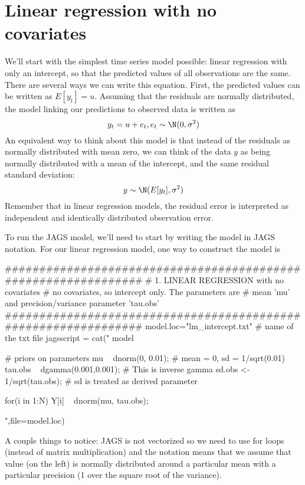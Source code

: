 \section{Linear regression with no covariates}\label{sec:lr-no-covariates}
We'll start with the simplest time series model possible: linear regression with only an intercept, so that the predicted values of all observations are the same. There are several ways we can write this equation. First, the predicted values can be written as $E[{y}_{t}] = u$. Assuming that the residuals are normally distributed, the model linking our predictions to observed data is written as 
\begin{equation}
y_t = u + e_t, e_t \sim \N(0,\sigma^2)
\end{equation}
An equivalent way to think about this model is that instead of the residuals as normally distributed with mean zero, we can think of the data $y$ as being normally distributed with a mean of the intercept, and the same residual standard deviation:
\begin{equation}
y \sim \N(E[y_t],\sigma^2)
\end{equation}
Remember that in linear regression models, the residual error is interpreted as independent and identically distributed observation error.

To run the JAGS model, we'll need to start by writing the model in JAGS notation. For our linear regression model, one way to construct the model is 

\begin{Schunk}
\begin{Sinput}
 ###############################################################
 # 1. LINEAR REGRESSION with no covariates
 # no covariates, so intercept only. The parameters are 
 # mean 'mu' and precision/variance parameter 'tau.obs'
 ###############################################################
 model.loc="lm_intercept.txt" # name of the txt file
 jagsscript = cat("
 model {  
    # priors on parameters
    mu ~ dnorm(0, 0.01); # mean = 0, sd = 1/sqrt(0.01)
    tau.obs ~ dgamma(0.001,0.001); # This is inverse gamma
    sd.obs <- 1/sqrt(tau.obs); # sd is treated as derived parameter
 
     for(i in 1:N) {
       Y[i] ~ dnorm(mu, tau.obs);
    }
 }  
 ",file=model.loc)
\end{Sinput}
\end{Schunk}
A couple things to notice: JAGS is not vectorized so we need to use for loops (instead of matrix multiplication) and the \verb@dnorm@ notation means that we assume that value (on the left) is normally distributed around a particular mean with a particular precision (1 over the square root of the variance).

